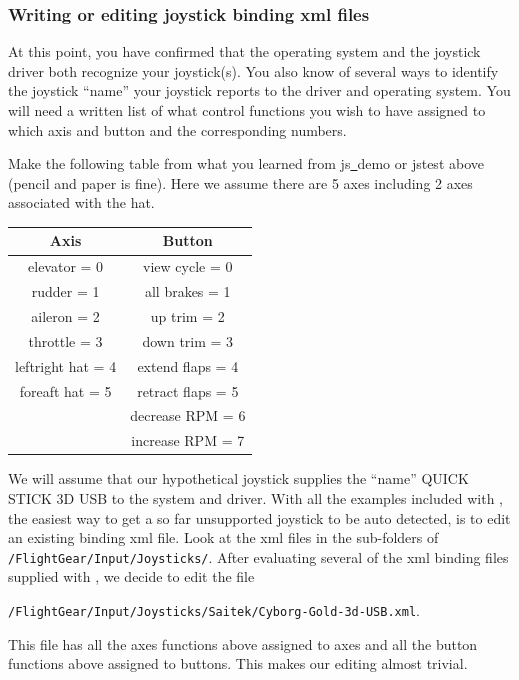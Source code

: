 \subsubsection{Writing or editing joystick binding xml files\label{writing}}
At this point, you have confirmed that the operating system and the joystick driver both recognize your joystick(s).  You also know of several ways to identify the joystick ``name'' your joystick reports to the driver and operating system.  You will need a written list of what control functions you wish to have assigned to which axis and button and the corresponding numbers.

 Make the following table from what you learned from js\underline{~}demo or jstest above (pencil and paper is fine).  Here we assume there are 5 axes including 2 axes associated with the hat.
\medskip

\begin{tabular}{c|c}
		Axis			      &           Button\\\hline
	elevator 	= 0	     &     	view cycle 	= 0\\
	rudder 		= 1	     &     	all brakes 	= 1\\
	aileron 	= 2	     &      	up trim 	= 2\\
	throttle 	= 3		   &       down trim 	= 3\\
	leftright hat 	= 4&	    	extend flaps	= 4\\
	foreaft hat 	= 5	&	      retract flaps	= 5\\
					          &        decrease RPM	= 6\\
					          &        increase RPM	= 7
\end{tabular}
\medskip


We will assume that our hypothetical joystick supplies the ``name'' QUICK STICK 3D USB to the system and driver. With all the examples included with \FlightGear{}, the easiest way to get a so far unsupported joystick to be auto detected, is to edit an existing binding xml file.  Look at the xml files in the sub-folders of \texttt{/FlightGear/Input/Joysticks/}. After evaluating several of the xml binding files supplied with \FlightGear{}, we decide to edit the file

\noindent
 \texttt{/FlightGear/Input/Joysticks/Saitek/Cyborg-Gold-3d-USB.xml}.

 \noindent
  This file has all the axes functions above assigned to axes and all the button functions above assigned to buttons.  This makes our editing almost trivial.


